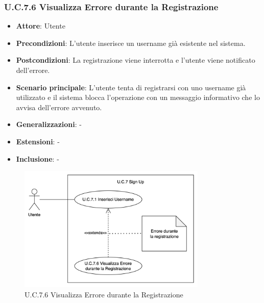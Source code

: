 \subsubsection{U.C.7.6 Visualizza Errore durante la Registrazione}
\begin{itemize}
    \item \textbf{Attore}: Utente
    \item \textbf{Precondizioni}: L'utente inserisce un username già esistente nel sistema.
    \item \textbf{Postcondizioni}: La registrazione viene interrotta e l'utente viene notificato dell'errore.  
    \item \textbf{Scenario principale}: L'utente tenta di registrarsi con uno username già utilizzato e il sistema blocca l'operazione con un messaggio informativo che lo avvisa dell'errore avvenuto. 
    \item \textbf{Generalizzazioni}: -
    \item \textbf{Estensioni}: -
    \item \textbf{Inclusione}: -
\end{itemize}
\begin{figure}[H]
    \centering
    \includegraphics[width=0.8\textwidth]{img/NUOVO7.6.png}
    \caption{U.C.7.6 Visualizza Errore durante la Registrazione}
\end{figure}
\newpage

